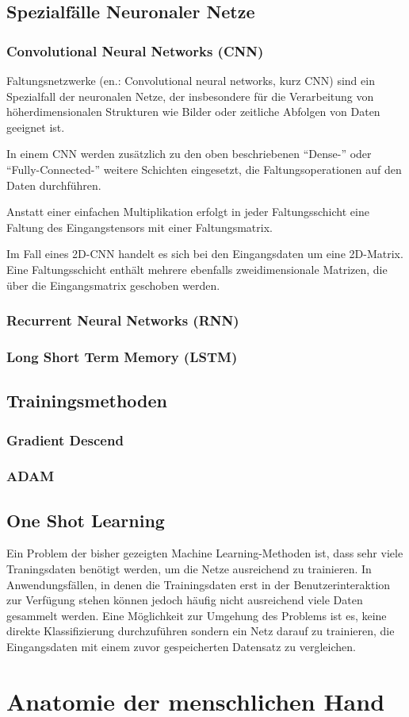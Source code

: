 		
	\subsection { Spezialfälle Neuronaler Netze}
		\subsubsection { Convolutional Neural Networks (CNN) }
		Faltungsnetzwerke (en.: Convolutional neural networks, kurz CNN) sind ein Spezialfall der neuronalen Netze, der insbesondere für die Verarbeitung von höherdimensionalen Strukturen wie Bilder oder zeitliche Abfolgen von Daten geeignet ist. 
		
		In einem CNN werden zusätzlich zu den oben beschriebenen "`Dense-"' oder "`Fully-Connected-"' weitere Schichten eingesetzt, die Faltungsoperationen auf den Daten durchführen.
		
		Anstatt einer einfachen Multiplikation erfolgt in jeder Faltungsschicht eine Faltung des Eingangstensors mit einer Faltungsmatrix.
		
		Im Fall eines 2D-CNN handelt es sich bei den Eingangsdaten um eine 2D-Matrix. Eine Faltungsschicht enthält mehrere ebenfalls zweidimensionale Matrizen, die über die Eingangsmatrix geschoben werden. 
		
		
		
		
		\subsubsection { Recurrent Neural Networks (RNN) }
		\subsubsection { Long Short Term Memory (LSTM) }
	
	\subsection { Trainingsmethoden }
	
		\subsubsection{Gradient Descend}
		\subsubsection{ADAM}
		
	\subsection{ One Shot Learning }
	Ein Problem der bisher gezeigten Machine Learning-Methoden ist, dass sehr viele Traningsdaten benötigt werden, um die Netze ausreichend zu trainieren. In Anwendungsfällen, in denen die Trainingsdaten erst in der Benutzerinteraktion zur Verfügung stehen können jedoch häufig nicht ausreichend viele Daten gesammelt werden. Eine Möglichkeit zur Umgehung des Problems ist es, keine direkte Klassifizierung durchzuführen sondern ein Netz darauf zu trainieren, die Eingangsdaten mit einem zuvor gespeicherten Datensatz zu vergleichen. 
	
\section { Anatomie der menschlichen Hand }
	